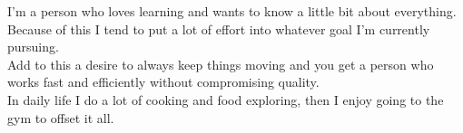 \documentclass[a4paper]{twentysecondcv} %
\begin{document}





{\hspace{1em}
I'm a person who loves learning and wants to know a little bit about everything. Because of this I tend to put a lot of effort into whatever goal I'm currently pursuing.\\

Add to this a desire to always keep things moving and you get a person who works fast and efficiently without compromising quality.\\

In daily life I do a lot of cooking and food exploring, then I enjoy going to the gym to offset it all.}


    
    

\makeprofile %

\end{document}
